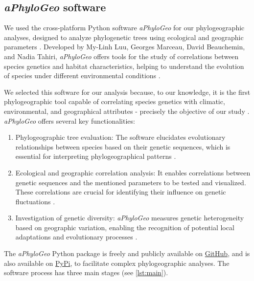 \subsection{{\textit{aPhyloGeo} software}\label{aPhyloGeo-software}}
We used the cross-platform Python software \textit{aPhyloGeo} for our phylogeographic analyses, designed to analyze phylogenetic trees using ecological and geographic parameters \citep{koshkarov_phylogeography_2022}. Developed by My-Linh Luu, Georges Marceau, David Beauchemin, and Nadia Tahiri, \textit{aPhyloGeo} offers tools for the study of correlations between species genetics and habitat characteristics, helping to understand the evolution of species under different environmental conditions \citep{koshkarov_phylogeography_2022}. 

We selected this software for our analysis because, to our knowledge, it is the first phylogeographic tool capable of correlating species genetics with climatic, environmental, and geographical attributes - precisely the objective of our study \citep{koshkarov_phylogeography_2022}. \textit{aPhyloGeo} offers several  key functionalities:

\begin{enumerate}[label=\arabic*.]
\item Phylogeographic tree evaluation: The software elucidates evolutionary relationships between species based on their genetic sequences, which is essential for interpreting phylogeographical patterns \citep{koshkarov_phylogeography_2022}.
\item Ecological and geographic correlation analysis: It enables correlations between genetic sequences and the mentioned parameters to be tested and visualized. These correlations are crucial for identifying their influence on genetic fluctuations \citep{koshkarov_phylogeography_2022}.
\item Investigation of genetic diversity: \textit{aPhyloGeo} measures genetic heterogeneity based on geographic variation, enabling the recognition of potential local adaptations and evolutionary processes \citep{manel_perspectives_2010}.
\end{enumerate}

The \textit{aPhyloGeo} Python package is freely and publicly available on \href{https://github.com/tahiri-lab/aPhyloGeo}{GitHub}, and is also available on \href{https://pypi.org/project/aphylogeo/}{PyPi}, to facilitate complex phylogeographic analyses. The software process has three main stages (see \autoref{lst:main}).

